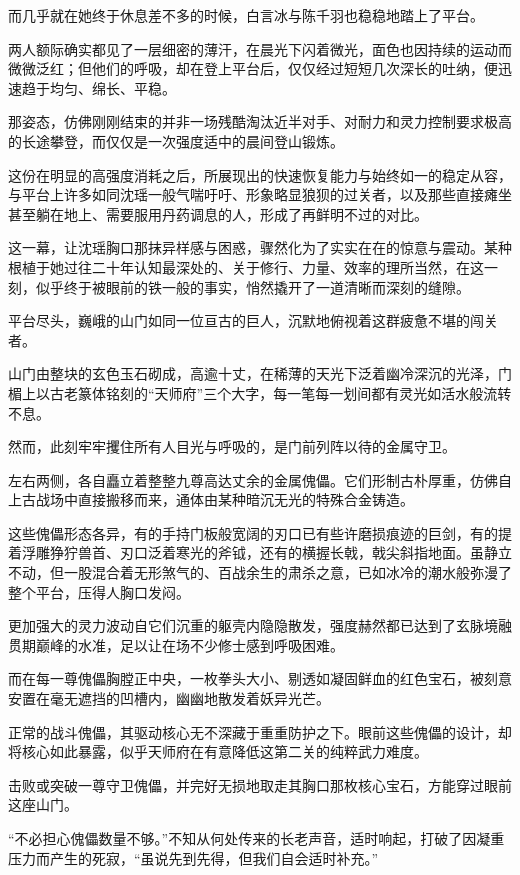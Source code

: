 而几乎就在她终于休息差不多的时候，白言冰与陈千羽也稳稳地踏上了平台。

两人额际确实都见了一层细密的薄汗，在晨光下闪着微光，面色也因持续的运动而微微泛红；但他们的呼吸，却在登上平台后，仅仅经过短短几次深长的吐纳，便迅速趋于均匀、绵长、平稳。

那姿态，仿佛刚刚结束的并非一场残酷淘汰近半对手、对耐力和灵力控制要求极高的长途攀登，而仅仅是一次强度适中的晨间登山锻炼。

这份在明显的高强度消耗之后，所展现出的快速恢复能力与始终如一的稳定从容，与平台上许多如同沈瑶一般气喘吁吁、形象略显狼狈的过关者，以及那些直接瘫坐甚至躺在地上、需要服用丹药调息的人，形成了再鲜明不过的对比。

这一幕，让沈瑶胸口那抹异样感与困惑，骤然化为了实实在在的惊意与震动。某种根植于她过往二十年认知最深处的、关于修行、力量、效率的理所当然，在这一刻，似乎终于被眼前的铁一般的事实，悄然撬开了一道清晰而深刻的缝隙。

\vspace{2em}

平台尽头，巍峨的山门如同一位亘古的巨人，沉默地俯视着这群疲惫不堪的闯关者。

山门由整块的玄色玉石砌成，高逾十丈，在稀薄的天光下泛着幽冷深沉的光泽，门楣上以古老篆体铭刻的“天师府”三个大字，每一笔每一划间都有灵光如活水般流转不息。

然而，此刻牢牢攫住所有人目光与呼吸的，是门前列阵以待的金属守卫。

左右两侧，各自矗立着整整九尊高达丈余的金属傀儡。它们形制古朴厚重，仿佛自上古战场中直接搬移而来，通体由某种暗沉无光的特殊合金铸造。

这些傀儡形态各异，有的手持门板般宽阔的刃口已有些许磨损痕迹的巨剑，有的提着浮雕狰狞兽首、刃口泛着寒光的斧钺，还有的横握长戟，戟尖斜指地面。虽静立不动，但一股混合着无形煞气的、百战余生的肃杀之意，已如冰冷的潮水般弥漫了整个平台，压得人胸口发闷。

更加强大的灵力波动自它们沉重的躯壳内隐隐散发，强度赫然都已达到了玄脉境融贯期巅峰的水准，足以让在场不少修士感到呼吸困难。

而在每一尊傀儡胸膛正中央，一枚拳头大小、剔透如凝固鲜血的红色宝石，被刻意安置在毫无遮挡的凹槽内，幽幽地散发着妖异光芒。

正常的战斗傀儡，其驱动核心无不深藏于重重防护之下。眼前这些傀儡的设计，却将核心如此暴露，似乎天师府在有意降低这第二关的纯粹武力难度。

击败或突破一尊守卫傀儡，并完好无损地取走其胸口那枚核心宝石，方能穿过眼前这座山门。

“不必担心傀儡数量不够。”不知从何处传来的长老声音，适时响起，打破了因凝重压力而产生的死寂，“虽说先到先得，但我们自会适时补充。”

